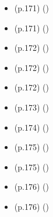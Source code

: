 \begin{isabellebody}
\begin{isamarkuptext}
\begin{itemize}
    \item (p.171)  
      \hfill ()
    \item (p.171)  
      \hfill ()
    \item (p.172)  
      \hfill ()
    \item (p.172)  
      \hfill ()
    \item (p.172)  
      \hfill ()
    \item (p.173)  
      \hfill ()
    \item (p.174)  
      \hfill ()
    \item (p.175)  
      \hfill ()
    \item (p.175)  
      \hfill ()
    \item (p.176)  
      \hfill ()
    \item (p.176)  
      \hfill ()

\end{itemize}
\end{isamarkuptext}
\end{isabellebody}
